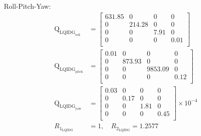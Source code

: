 \documentclass[conference]{IEEEtran}
\begin{document}
Roll-Pitch-Yaw:
\begin{equation}
	\begin{split}
		\boldsymbol{\mathrm{Q}}_{{\text{LQIDG}_{\text{roll}}}} &= \begin{bmatrix}
			631.85 & 0 & 0 & 0  \\ 
			0 & 214.28 & 0 & 0  \\ 
			0 & 0 & 7.91 & 0  \\ 
			0 & 0 & 0 & 0.01  \\ 
		\end{bmatrix} \\[1em]
		\boldsymbol{\mathrm{Q}}_{{\text{LQIDG}_{\text{pitch}}}} &= \begin{bmatrix}
			0.01 & 0 & 0 & 0  \\
			0 & 873.93 & 0 & 0  \\ 
			0 & 0 & 9853.09 & 0 \\ 
			0 & 0 & 0 & 0.12  \\ 
		\end{bmatrix}\\[1em]
		\boldsymbol{\mathrm{Q}}_{{\text{LQIDG}_{\text{yaw}}}}  &= \begin{bmatrix}
			0.03 & 0 & 0 & 0 \\ 
			0 & 0.17 & 0 & 0 \\ 
			0 & 0 & 1.81 & 0 \\ 
			0 & 0 & 0 & 0.45 \\
		\end{bmatrix}\times 10^{-4}\\[1em]
          R_{1_{\text{LQIDG}}} &= 1, \quad  R_{2_{\text{LQIDG}}} = 1.2577
	\end{split}
\end{equation}
















\end{document}
